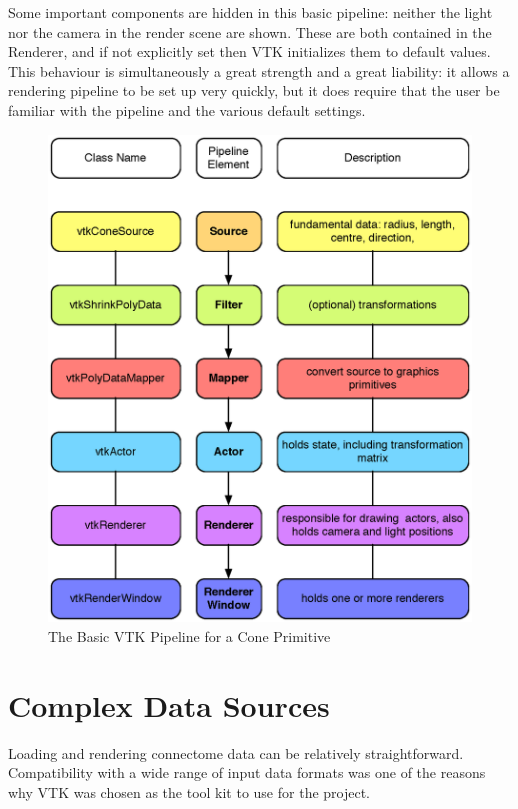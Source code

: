 \documentclass[MSc,paper=a4,pagesize=auto]{icldt}
\begin{document}
Some important components are hidden in this basic pipeline: neither the light nor the camera in the render scene are	 shown. These are both contained in the Renderer, and if not explicitly set then VTK initializes them to default values. This behaviour is simultaneously a great strength and a great liability: it allows a rendering pipeline to be set up very quickly, but it does require that the user be familiar with the pipeline and the various default settings.

\begin{figure}[htbp!]
    \centering
    \includegraphics[width=1\textwidth]{resources/vtk_pipeline}
    \caption{The Basic VTK Pipeline for a Cone Primitive}
    \label{fig:vtk_pipeline}
\end{figure}


\section{Complex Data Sources}
Loading and rendering connectome data can be relatively straightforward. Compatibility with a wide range of input data formats was one of the reasons why VTK was chosen as the tool kit to use for the project.
\end{document}
